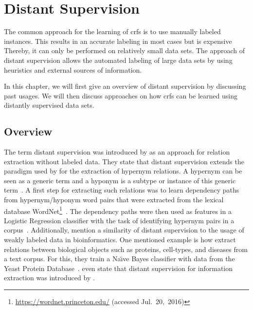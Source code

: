 \chapter{Distant Supervision}\label{cha:distant-supervision}

The common approach for the learning of \glspl{crf} is to use manually labeled instances.
This results in an accurate labeling in most cases but is expensive
Thereby, it can only be performed on relatively small data sets.
The approach of \gls{distant supervision} allows the automated labeling of large data sets by using heuristics and external sources of information.

In this chapter, we will first give an overview of \gls{distant supervision} by discussing past usages.
We will then discuss approaches on how \glspl{crf} can be learned using distantly supervised data sets.

\section{Overview}\label{sec:overview}

The term \gls{distant supervision} was introduced by \citet{mintz2009distant} as an approach for relation extraction without labeled data.
They state that \gls{distant supervision} extends the paradigm used by \citet{snow2005learning} for the extraction of hypernym relations.
A hypernym can be seen as a generic term and a hyponym is a subtype or instance of this generic term~\citep{snow2005learning}.
A first step for extracting such relations was to learn dependency paths from hypernym/hyponym word pairs that were extracted from the lexical database WordNet\footnote{\url{https://wordnet.princeton.edu/} (accessed Jul.~20,~2016)}~\citep{snow2005learning}.
The dependency paths were then used as features in a Logistic Regression classifier with the task of identifying hypernym pairs in a corpus~\citep{snow2005learning}.
Additionally, \citet{mintz2009distant} mention a similarity of \gls{distant supervision} to the usage of weakly labeled data in bioinformatics.
One mentioned example is how \citet{craven1999constructing} extract relations between biological objects such as proteins, cell-types, and diseases from a text corpus.
For this, they train a Na\"{\i}ve Bayes classifier with data from the Yeast Protein Database~\citep{payne1997yeast}.
\citet{surdeanu2012multi} even state that distant supervision for information extraction was introduced by \citet{craven1999constructing}.

